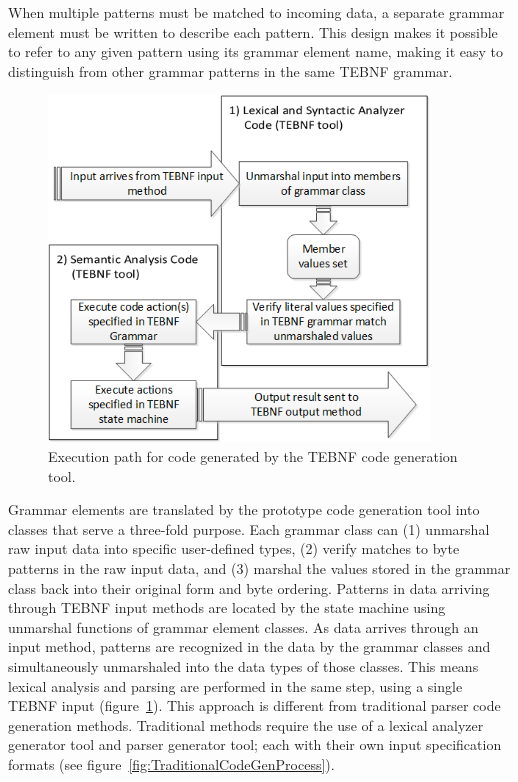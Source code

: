 \indent
When multiple patterns must be matched to incoming data, a separate grammar element must be written to describe each pattern.  This design makes it possible to refer to any given pattern using its grammar element name, making it easy to distinguish from other grammar patterns in the same TEBNF grammar.

\begin{figure}[htbp]
\centering
\includegraphics[width=0.9\textwidth]{figures/GeneratedCodeExecutionPath.png}
\caption{Execution path for code generated by the TEBNF code generation tool.}
\label{fig:GeneratedCodeExecutionPath}
\end{figure}

\indent
Grammar elements are translated by the prototype code generation tool into classes that serve a three-fold purpose.  Each grammar class can (1) unmarshal raw input data into specific user-defined types, (2) verify matches to byte patterns in the raw input data, and (3) marshal the values stored in the grammar class back into their original form and byte ordering.  Patterns in data arriving through TEBNF input methods are located by the state machine using unmarshal functions of grammar element classes.  As data arrives through an input method, patterns are recognized in the data by the grammar classes and simultaneously unmarshaled into the data types of those classes.  This means lexical analysis and parsing are performed in the same step, using a single TEBNF input (figure~\ref{fig:GeneratedCodeExecutionPath}).  This approach is different from traditional parser code generation methods.  Traditional methods require the use of a lexical analyzer generator tool and parser generator tool; each with their own input specification formats (see figure~\ref{fig:TraditionalCodeGenProcess}).

